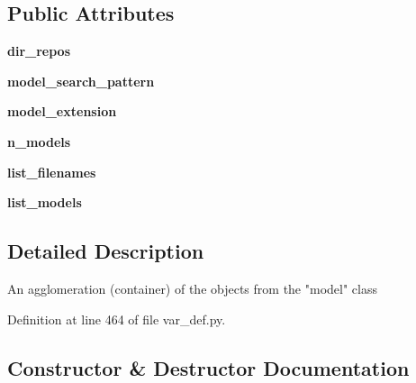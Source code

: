 \subsection*{Public Attributes}
\begin{DoxyCompactItemize}
\item 
\mbox{\label{classasamba_1_1var__def_1_1models_a44661e2a402b05c80da5c9387d030a0d}} 
{\bfseries dir\+\_\+repos}
\item 
\mbox{\label{classasamba_1_1var__def_1_1models_a3d6a55a38b5b43d6c0780ed4c26f885f}} 
{\bfseries model\+\_\+search\+\_\+pattern}
\item 
\mbox{\label{classasamba_1_1var__def_1_1models_ac27eceb3a2d44515e86329f0f36ccebd}} 
{\bfseries model\+\_\+extension}
\item 
\mbox{\label{classasamba_1_1var__def_1_1models_a56ca32e9e5fc6ced55d70e4e4e102ea2}} 
{\bfseries n\+\_\+models}
\item 
\mbox{\label{classasamba_1_1var__def_1_1models_a4807b6490e5b7afe8377880762049b86}} 
{\bfseries list\+\_\+filenames}
\item 
\mbox{\label{classasamba_1_1var__def_1_1models_a7716492752231f81909b728d633f4494}} 
{\bfseries list\+\_\+models}
\end{DoxyCompactItemize}


\subsection{Detailed Description}
\begin{DoxyVerb}An agglomeration (container) of the objects from the "model" class
\end{DoxyVerb}
 

Definition at line 464 of file var\+\_\+def.\+py.



\subsection{Constructor \& Destructor Documentation}
\mbox{\label{classasamba_1_1var__def_1_1models_a21b6a3b0d85fafe41208098a03fcf7ab}} 
